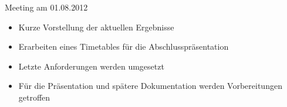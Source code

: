\begin{frame}
\begin{block}{Meeting am 01.08.2012}
\begin{itemize}[<+->]
\pause\item Kurze Vorstellung der aktuellen Ergebnisse
\item Erarbeiten eines Timetables für die Abschlusspräsentation
\item Letzte Anforderungen werden umgesetzt
\item Für die Präsentation und spätere Dokumentation werden Vorbereitungen getroffen
\end{itemize}
\end{block}
\end{frame}
